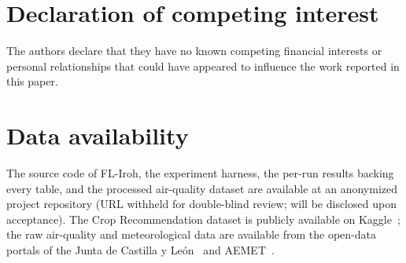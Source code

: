\documentclass[a4paper,fleqn]{cas-dc}
\begin{document}
\section*{Declaration of competing interest}
The authors declare that they have no known competing financial interests or personal relationships that could have appeared to influence the work reported in this paper.

\section*{Data availability}
The source code of FL-Iroh, the experiment harness, the per-run results backing every table, and the processed air-quality dataset are available at an anonymized project repository (URL withheld for double-blind review; will be disclosed upon acceptance). The Crop Recommendation dataset is publicly available on Kaggle~\cite{cropdataset}; the raw air-quality and meteorological data are available from the open-data portals of the Junta de Castilla y Le\'on~\cite{cyl2023airquality} and AEMET~\cite{aemet2023}.
\end{document}

